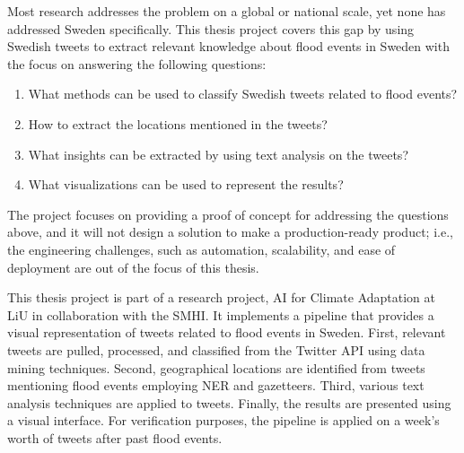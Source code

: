 Most research addresses the problem on a global or national scale, yet none has addressed Sweden
specifically. This thesis project covers this gap by using Swedish tweets to extract relevant
knowledge about flood events in Sweden with the focus on answering the following questions:
\begin{enumerate} 
  \item What methods can be used to classify Swedish tweets related to flood events?
  \item How to extract the locations mentioned in the tweets? 
  \item What insights can be extracted by using text analysis on the tweets?
  \item What visualizations can be used to represent the results? 
\end{enumerate}

The project focuses on providing a proof of concept for addressing the questions above, and it will
not design a solution to make a production-ready product; i.e., the engineering challenges, such as
automation, scalability, and ease of deployment are out of the focus of this thesis. 

This thesis project is part of a research project, AI for Climate Adaptation
\cite{nesetAI4ClimateAdaptation} at \ac{LiU} in collaboration with the \ac{SMHI}. It implements a
pipeline that provides a visual representation of tweets related to flood events in Sweden. First,
relevant tweets are pulled, processed, and classified from the Twitter \ac{API} using data mining
techniques. Second, geographical locations are identified from tweets mentioning flood events employing
\ac{NER} and gazetteers. Third, various text analysis techniques are applied to tweets. Finally, the
results are presented using a visual interface. For verification purposes, the pipeline is applied
on a week's worth of tweets after past flood events.
